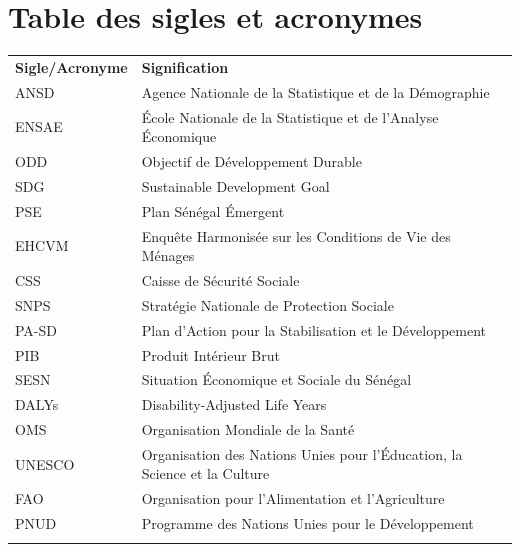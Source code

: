 \chapter*{Table des sigles et acronymes}


\begin{table}[H]
	\centering
	\small
	\renewcommand{\arraystretch}{1.4}
	\begin{tabularx}{\textwidth}{l l}
		\rowcolor[HTML]{003D82}
		\color{white}\textbf{Sigle/Acronyme} & \color{white}\textbf{Signification} \\
		\rowcolor[HTML]{F5F8FC}
		ANSD & Agence Nationale de la Statistique et de la Démographie \\
		\rowcolor[HTML]{E8F0FF}
		ENSAE & École Nationale de la Statistique et de l'Analyse Économique \\
		\rowcolor[HTML]{F5F8FC}
		ODD & Objectif de Développement Durable \\
		\rowcolor[HTML]{E8F0FF}
		SDG & Sustainable Development Goal \\
		\rowcolor[HTML]{F5F8FC}
		PSE & Plan Sénégal Émergent \\
		\rowcolor[HTML]{E8F0FF}
		EHCVM & Enquête Harmonisée sur les Conditions de Vie des Ménages \\
		\rowcolor[HTML]{F5F8FC}
		CSS & Caisse de Sécurité Sociale \\
		\rowcolor[HTML]{E8F0FF}
		SNPS & Stratégie Nationale de Protection Sociale \\
		\rowcolor[HTML]{F5F8FC}
		PA-SD & Plan d'Action pour la Stabilisation et le Développement \\
		\rowcolor[HTML]{E8F0FF}
		PIB & Produit Intérieur Brut \\
		\rowcolor[HTML]{F5F8FC}
		SESN & Situation Économique et Sociale du Sénégal \\
		\rowcolor[HTML]{E8F0FF}
		DALYs & Disability-Adjusted Life Years \\
		\rowcolor[HTML]{F5F8FC}
		OMS & Organisation Mondiale de la Santé \\
		\rowcolor[HTML]{F5F8FC}
		UNESCO & Organisation des Nations Unies pour l'Éducation, la Science et la Culture \\
		\rowcolor[HTML]{E8F0FF}
		FAO & Organisation pour l'Alimentation et l'Agriculture \\
		\rowcolor[HTML]{F5F8FC}
		PNUD & Programme des Nations Unies pour le Développement \\
		\rowcolor[HTML]{E8F0FF}

\end{tabularx}
\end{table}
